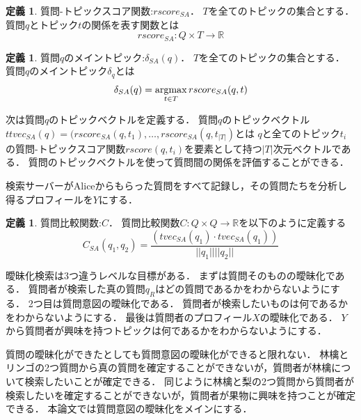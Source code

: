 \documentclass[master]{suribt}
\theoremstyle{definition}
\newtheorem{defi}[thm]{定義}
\newcommand{\argmax}{\mathop{\rm argmax}\limits}
\begin{document}
 \begin{defi}{質問-トピックスコア関数:$rscore_{SA}$．}
  $T$を全てのトピックの集合とする．
  質問$q$とトピック$t$の関係を表す関数とは
  \begin{equation}
   rscore_{SA}:Q \times T \to \mathbb{R}
  \end{equation}
 \end{defi}

 \begin{defi}{質問$q$のメイントピック:$\delta_{SA}(q)$．}
  $T$を全てのトピックの集合とする．
  質問$q$のメイントピック$\delta_q$とは
  \begin{equation}
   \delta_{SA}(q) = \argmax_{t \in T} rscore_{SA}(q,t)
  \end{equation}
 \end{defi}

 次は質問$q$のトピックベクトルを定義する．
 質問$q$のトピックベクトル$ttvec_{SA}(q) = (rscore_{SA}(q,t_1 ), \dots , rscore_{SA}(q,t_{|T|})$とは
 $q$と全てのトピック$t_i$の質問-トピックスコア関数$rscore(q, t_i)$を要素として持つ$|T|$次元ベクトルである．
 質問のトピックベクトルを使って質問間の関係を評価することができる．

 検索サーバーがAliceからもらった質問をすべて記録し，その質問たちを分析し得るプロフィールを$Y$にする．

 \begin{defi}{質問比較関数:$C$．}
  質問比較関数$C:Q \times Q \rightarrow \mathbb{R}$を以下のように定義する
  \begin{equation}
  C_{SA}(q_1,q_2) = \frac{(tvec_{SA}(q_1) \cdot tvec_{SA}(q_1))}{||q_1|| ||q_2||}
  \end{equation}
 \end{defi}
 
 
 曖昧化検索は3つ違うレベルな目標がある．
 まずは質問そのものの曖昧化である．
 質問者が検索した真の質問$q_R$はどの質問であるかをわからないようにする．
 2つ目は質問意図の曖昧化である．
 質問者が検索したいものは何であるかをわからないようにする．
 最後は質問者のプロフィール$X$の曖昧化である．
 $Y$から質問者が興味を持つトピックは何であるかをわからないようにする．
 
 質問の曖昧化ができたとしても質問意図の曖昧化ができると限れない．
 {林檎}と{リンゴ}の2つ質問から真の質問を確定することができないが，質問者が林檎について検索したいことが確定できる．
 同じように{林檎}と{梨}の2つ質問から質問者が検索したいを確定することができないが，質問者が果物に興味を持つことが確定できる．
 本論文では質問意図の曖昧化をメインにする．
\end{document}
